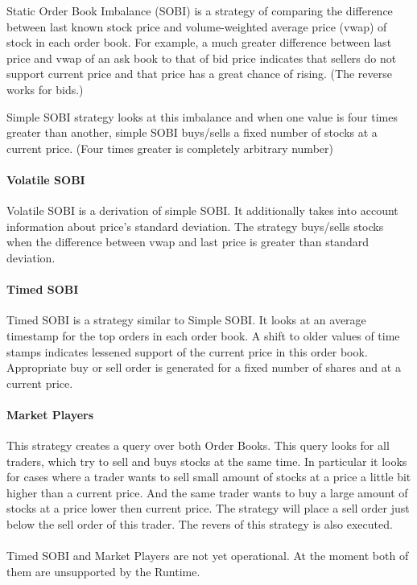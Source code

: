 \documentclass[14pt]{article}
\begin{document}
Static Order Book Imbalance (SOBI) is a strategy of comparing the difference
between last known stock price and volume-weighted average price (vwap) of stock
in each order book. For example, a much greater difference between last price
and vwap of an ask book to that of bid price indicates that sellers do not
support current price and that price has a great chance of rising. (The reverse
works for bids.)

Simple SOBI strategy looks at this imbalance and when one value is four times
greater than another, simple SOBI buys/sells a fixed number of stocks at a
current price. (Four times greater is completely arbitrary number)

\paragraph{Volatile SOBI}

Volatile SOBI is a derivation of simple SOBI. It additionally takes into account
information about price's standard deviation. The strategy buys/sells stocks
when the difference between vwap and last price is greater than standard
deviation.

\paragraph{Timed SOBI}

Timed SOBI is a strategy similar to Simple SOBI. It looks at an average
timestamp for the top orders in each order book. A shift to older values of time
stamps indicates lessened support of the current price in this order
book. Appropriate buy or sell order is generated for a fixed number of shares
and at a current price.

\paragraph{Market Players}
 

This strategy creates a query over both Order Books. This query looks for all
traders, which try to sell and buys stocks at the same time. In particular it
looks for cases where a trader wants to sell small amount of stocks at a price a
little bit higher than a current price. And the same trader wants to buy a large
amount of stocks at a price lower then current price. The strategy will place a
sell order just below the sell order of this trader. The revers of this strategy
is also executed.
\\
\\
Timed SOBI and Market Players are not yet operational. At the moment both of
them are unsupported by the Runtime.
\end{document}
